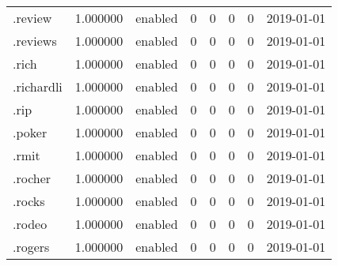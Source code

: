 \begin{tabular}{lrlrrrrl}
.review                   &          1.000000 &         enabled &                           0 &                           0 &                           0 &                   0 &           2019-01-01 \\
.reviews                  &          1.000000 &         enabled &                           0 &                           0 &                           0 &                   0 &           2019-01-01 \\
.rich                     &          1.000000 &         enabled &                           0 &                           0 &                           0 &                   0 &           2019-01-01 \\
.richardli                &          1.000000 &         enabled &                           0 &                           0 &                           0 &                   0 &           2019-01-01 \\
.rip                      &          1.000000 &         enabled &                           0 &                           0 &                           0 &                   0 &           2019-01-01 \\
.poker                    &          1.000000 &         enabled &                           0 &                           0 &                           0 &                   0 &           2019-01-01 \\
.rmit                     &          1.000000 &         enabled &                           0 &                           0 &                           0 &                   0 &           2019-01-01 \\
.rocher                   &          1.000000 &         enabled &                           0 &                           0 &                           0 &                   0 &           2019-01-01 \\
.rocks                    &          1.000000 &         enabled &                           0 &                           0 &                           0 &                   0 &           2019-01-01 \\
.rodeo                    &          1.000000 &         enabled &                           0 &                           0 &                           0 &                   0 &           2019-01-01 \\
.rogers                   &          1.000000 &         enabled &                           0 &                           0 &                           0 &                   0 &           2019-01-01 \\

\end{tabular}
